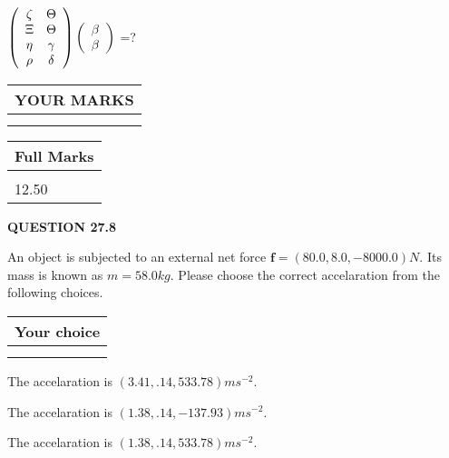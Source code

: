 \documentclass[12pt]{article}
\begin{document}
 
$  %
 \left( \begin{array}
 {
 c
 c
 }
                    \zeta & 
 \Theta \\ 
                    \Xi & 
 \Theta \\ 
 \eta & 
 \gamma \\ 
 \rho & 
 \delta
 \end{array} \right)
 \left( \begin{array}
 {
 c
 }
 \beta \\ 
 \beta
 \end{array} \right)
$ =?
 

 

 
\vspace{0.3in}
  
\vspace{0.2in}
  
\noindent\begin{tabular}{|l|}
\hline
 YOUR MARKS  \\
\hline
 \\ 
 \\ 
\hline
\end{tabular}
\hspace{0.05in} \begin{tabular}{|l|}
\hline
 Full Marks  \\
\hline
 \\ 
12.50 \\
\hline
\end{tabular}
{\textbf{\Large{QUESTION
27.8 
}}}
  
  
 
An object is subjected to an external net force $\mathbf{f}=
(80.0 , 8.0 , -8000.0) N$.
Its mass is known as $m= %
58.0 kg$.
Please choose the correct accelaration from the following choices.
  
  
\noindent\hspace{3.0in} \begin{tabular}{|l|}
\hline
Your choice \\
\hline
 \\ 
 \\ 
\hline
\end{tabular}
  
  
 
 
  The accelaration is $  %
(
3.41,
.14,
533.78)
ms^{-2} $.
 
 
  The accelaration is $  %
(
1.38,
.14,
-137.93)
ms^{-2} $.
 
 
  The accelaration is $  %
(
1.38,
.14,
533.78)
ms^{-2} $.
 
\end{document}
